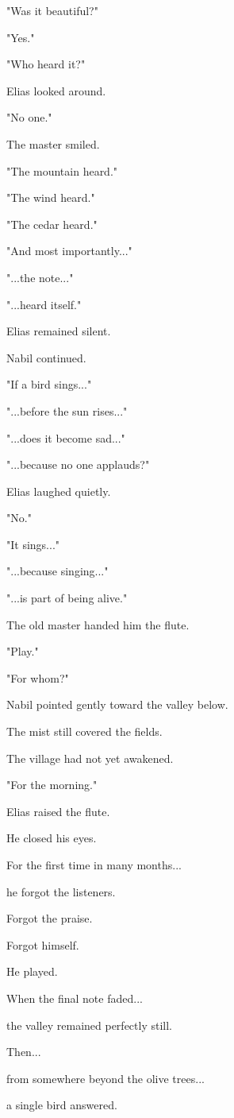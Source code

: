 \documentclass[12pt,openany]{book}
\begin{document}
"Was it beautiful?"

"Yes."

"Who heard it?"

Elias looked around.

"No one."

The master smiled.

"The mountain heard."

"The wind heard."

"The cedar heard."

"And most importantly..."

"...the note..."

"...heard itself."

Elias remained silent.

Nabil continued.

"If a bird sings..."

"...before the sun rises..."

"...does it become sad..."

"...because no one applauds?"

Elias laughed quietly.

"No."

"It sings..."

"...because singing..."

"...is part of being alive."

The old master handed him the flute.

"Play."

"For whom?"

Nabil pointed gently toward the valley below.

The mist still covered the fields.

The village had not yet awakened.

"For the morning."

Elias raised the flute.

He closed his eyes.

For the first time in many months...

he forgot the listeners.

Forgot the praise.

Forgot himself.

He played.

When the final note faded...

the valley remained perfectly still.

Then...

from somewhere beyond the olive trees...

a single bird answered.
\end{document}
